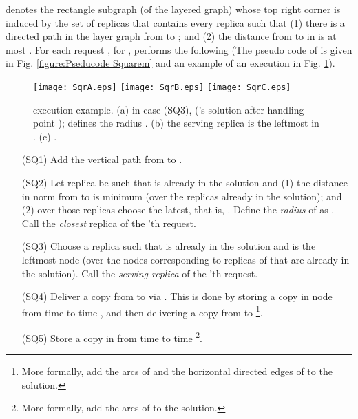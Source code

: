 \documentclass[11pt]{article}
\begin{document}
denotes the rectangle subgraph (of the layered graph) whose top right corner is  induced by the set of replicas
that contains every replica  such that
(1) there is a directed path in the layer graph from  to ; and
(2) the distance from  to  in  is at most .
For each request , for ,  performs the following
(The pseudo code of  is given in Fig. \ref{figure:Pseducode Squarem}
and an example of an execution in Fig. \ref{fig: Square execution SQ3}).



\begin{figure}[htb]
\begin{center}
\texttt{[image: SqrA.eps]}
\hfill
\texttt{[image: SqrB.eps]}
\hfill
\texttt{[image: SqrC.eps]}
\end{center}
\caption{\sf  execution example.
(a) in case (SQ3),  ('s solution after handling point );  defines the radius .
(b) the serving replica  is the leftmost in .
(c) .
\label{fig: Square execution SQ3}
}
\end{figure}


\begin{itemize}

\item[(SQ1)] Add the vertical path from  to .


\item[(SQ2)] Let replica  be such that  is already in the solution  and
    (1) the distance in  norm from  to  is minimum (over the replicas already in the solution); and
    (2) over those replicas choose the latest,
    that is, .
Define the {\em radius} of  as .
Call  the {\em closest} replica of the 'th request.




\item [(SQ3)] Choose a replica  such that  is already in the solution 
              and  is the leftmost node (over the nodes corresponding to replicas of  that are already in the solution).
              Call  the {\em serving replica} of the 'th request.



\item[(SQ4)]
Deliver a copy from  to  via .
This is done by storing a copy in node 
from time  to time ,
and then delivering a copy from  to 
\footnote{More formally, add the arcs of 
and the horizontal directed edges of 
to the solution.
}.


\item[(SQ5)]
Store a copy in  from time  to time 
\footnote{
More formally, add the arcs of 
to the solution.
}.

\end{itemize}
\end{document}
